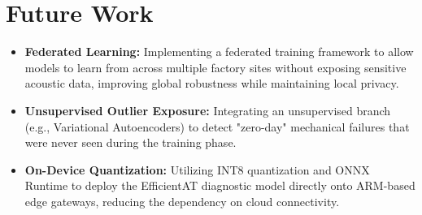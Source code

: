 \section{Future Work}
\begin{itemize}
    \item \textbf{Federated Learning:} Implementing a federated training framework to allow models to learn from across multiple factory sites without exposing sensitive acoustic data, improving global robustness while maintaining local privacy.
    \item \textbf{Unsupervised Outlier Exposure:} Integrating an unsupervised branch (e.g., Variational Autoencoders) to detect "zero-day" mechanical failures that were never seen during the training phase.
    \item \textbf{On-Device Quantization:} Utilizing INT8 quantization and ONNX Runtime to deploy the EfficientAT diagnostic model directly onto ARM-based edge gateways, reducing the dependency on cloud connectivity.
\end{itemize}
